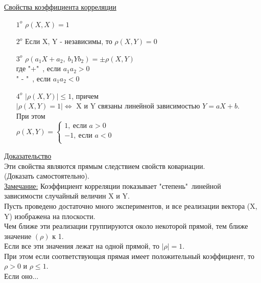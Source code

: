 \underline{Свойства коэффициента корреляции}\\
\begin{enumerate}
	\item[$1^o$] $\rho(X, X) = 1$
	\item[$2^o$] Если X, Y - независимы, то $\rho(X, Y) = 0$
	\item[$3^o$] $\rho(a_1 X + a_2, \ b_1 Y b_2) = \pm \rho(X, Y)$\\
	где "+"\ , если $a_1 a_2 > 0$\\
	" - "\  , если $a_1 a_2 < 0$
	
	\item[$4^o$] $|\rho(X, Y)| \leqslant 1$, причем\\
	$|\rho(X, Y) = 1| \Leftrightarrow$ X и Y связаны линейной зависимостью $Y = aX + b$.\\
	При этом \\
	$\rho(X, Y) = 
	\begin{cases}
		1, \ \text{если } a > 0 \\
		-1, \ \text{если } a < 0 \\
	\end{cases}$\\
\end{enumerate}


\underline{Доказательство}\\
Эти свойства являются прямым следствием свойств ковариации.\\
(Доказать самостоятельно).\\


\underline{Замечание:} Коэффициент корреляции показывает "степень"\ линейной зависимости случайный величин X и Y.\\
Пусть проведено достаточно много экспериментов, и все реализации вектора (X, Y) изображена на плоскости.\\
Чем ближе эти реализации группируются около некоторой прямой, тем ближе значение $(\rho)$ к 1.\\
Если все эти значения лежат на одной прямой, то $|\rho| = 1$.\\
При этом если соответствующая прямая имеет положительный коэффициент, то $\rho > 0$ и $\rho \leqslant 1$. \\
Если оно...






























